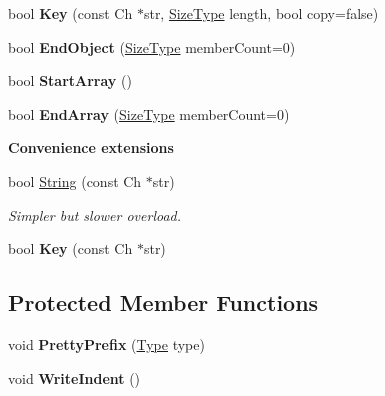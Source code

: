 \begin{Indent}
\begin{DoxyCompactItemize}
bool {\bfseries Key} (const Ch $\ast$str, \hyperlink{a00560_a5ed6e6e67250fadbd041127e6386dcb5}{Size\+Type} length, bool copy=false)
\item 
\mbox{\label{a02228_a6bfdfa4193193ef763cce5c592c4d20c}} 
bool {\bfseries End\+Object} (\hyperlink{a00560_a5ed6e6e67250fadbd041127e6386dcb5}{Size\+Type} member\+Count=0)
\item 
\mbox{\label{a02228_aec7fdf4798a3af5e31c147633f4798ed}} 
bool {\bfseries Start\+Array} ()
\item 
\mbox{\label{a02228_a1e9d97fc950d349f55abd864c787ff37}} 
bool {\bfseries End\+Array} (\hyperlink{a00560_a5ed6e6e67250fadbd041127e6386dcb5}{Size\+Type} member\+Count=0)
\end{DoxyCompactItemize}
\end{Indent}
\begin{Indent}\textbf{ Convenience extensions}\par
\begin{DoxyCompactItemize}
\item 
\mbox{\label{a02228_a7e85689355a827d273f272c26b447225}} 
bool \hyperlink{a02228_a7e85689355a827d273f272c26b447225}{String} (const Ch $\ast$str)
\begin{DoxyCompactList}\small\item\em Simpler but slower overload. \end{DoxyCompactList}\item 
\mbox{\label{a02228_a4b2a2a6eef02c12d7a3fd77966bd4499}} 
bool {\bfseries Key} (const Ch $\ast$str)
\end{DoxyCompactItemize}
\end{Indent}
\subsection*{Protected Member Functions}
\begin{DoxyCompactItemize}
\item 
\mbox{\label{a02228_a09709ffa3b545e007631ecfd35029843}} 
void {\bfseries Pretty\+Prefix} (\hyperlink{a00560_a1d1cfd8ffb84e947f82999c682b666a7}{Type} type)
\item 
\mbox{\label{a02228_a6f244ecc94fd5b134d424033b1574b7e}} 
void {\bfseries Write\+Indent} ()
\end{DoxyCompactItemize}
